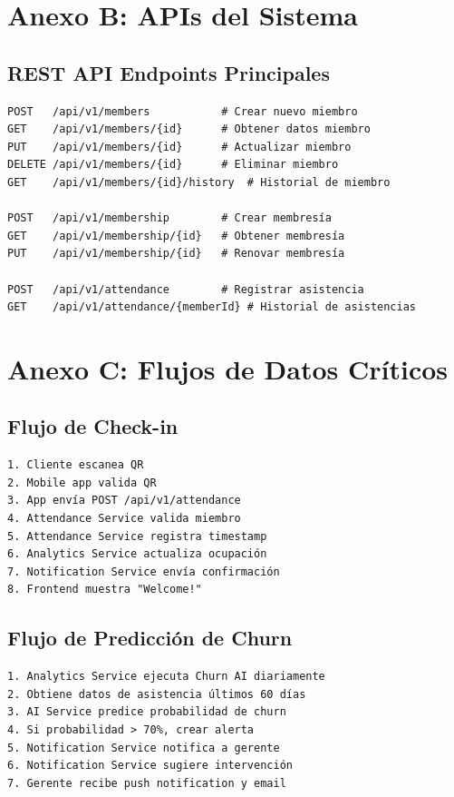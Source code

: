 \documentclass[11pt,a4paper]{article}
\begin{document}
\begin{itemize}
\section{Anexo B: APIs del Sistema}

\subsection{REST API Endpoints Principales}

\begin{lstlisting}[caption={Endpoints REST del Member Service}]
POST   /api/v1/members           # Crear nuevo miembro
GET    /api/v1/members/{id}      # Obtener datos miembro
PUT    /api/v1/members/{id}      # Actualizar miembro
DELETE /api/v1/members/{id}      # Eliminar miembro
GET    /api/v1/members/{id}/history  # Historial de miembro

POST   /api/v1/membership        # Crear membresía
GET    /api/v1/membership/{id}   # Obtener membresía
PUT    /api/v1/membership/{id}   # Renovar membresía

POST   /api/v1/attendance        # Registrar asistencia
GET    /api/v1/attendance/{memberId} # Historial de asistencias
\end{lstlisting}

\section{Anexo C: Flujos de Datos Críticos}

\subsection{Flujo de Check-in}

\begin{lstlisting}[caption={Flujo de Check-in de Miembro}]
1. Cliente escanea QR
2. Mobile app valida QR
3. App envía POST /api/v1/attendance
4. Attendance Service valida miembro
5. Attendance Service registra timestamp
6. Analytics Service actualiza ocupación
7. Notification Service envía confirmación
8. Frontend muestra "Welcome!"
\end{lstlisting}

\subsection{Flujo de Predicción de Churn}

\begin{lstlisting}[caption={Flujo de Detección de Churn}]
1. Analytics Service ejecuta Churn AI diariamente
2. Obtiene datos de asistencia últimos 60 días
3. AI Service predice probabilidad de churn
4. Si probabilidad > 70%, crear alerta
5. Notification Service notifica a gerente
6. Notification Service sugiere intervención
7. Gerente recibe push notification y email
\end{lstlisting}


\end{itemize}
\end{document}
